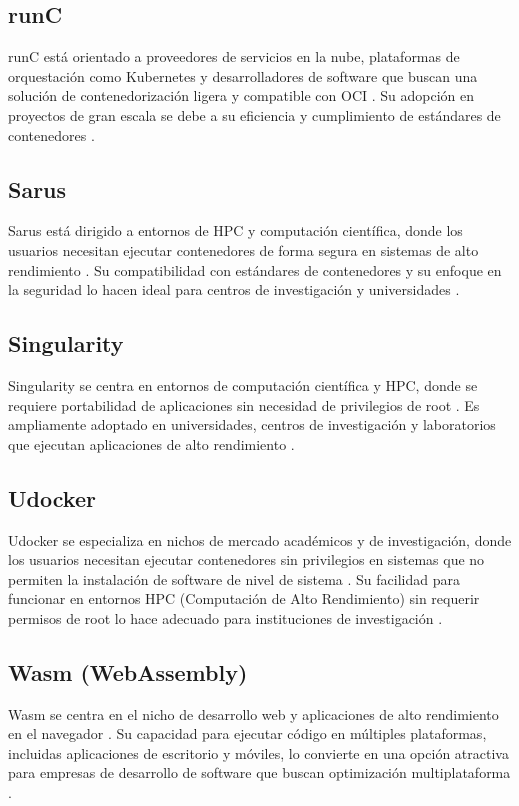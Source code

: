 \subsection{runC}
\noindent
runC está orientado a proveedores de servicios en la nube, plataformas de orquestación como Kubernetes y desarrolladores de software que buscan una solución de contenedorización ligera y compatible con OCI \citep{Perez2005}. Su adopción en proyectos de gran escala se debe a su eficiencia y cumplimiento de estándares de contenedores \citep{151962df5f7e4b9faba0629540c11439}.

\subsection{Sarus}
\noindent
Sarus está dirigido a entornos de HPC y computación científica, donde los usuarios necesitan ejecutar contenedores de forma segura en sistemas de alto rendimiento \citep{Sarus2021}. Su compatibilidad con estándares de contenedores y su enfoque en la seguridad lo hacen ideal para centros de investigación y universidades \citep{B2020}.

\subsection{Singularity}
\noindent
Singularity se centra en entornos de computación científica y HPC, donde se requiere portabilidad de aplicaciones sin necesidad de privilegios de root \citep{10.1145/3332186.3332192}. Es ampliamente adoptado en universidades, centros de investigación y laboratorios que ejecutan aplicaciones de alto rendimiento \citep{Kurtzer2017}.

\subsection{Udocker}
\noindent
Udocker se especializa en nichos de mercado académicos y de investigación, donde los usuarios necesitan ejecutar contenedores sin privilegios en sistemas que no permiten la instalación de software de nivel de sistema \citep{Campos2017}. Su facilidad para funcionar en entornos HPC (Computación de Alto Rendimiento) sin requerir permisos de root lo hace adecuado para instituciones de investigación \citep{Gomes2018}.

\subsection{Wasm (WebAssembly)}
\noindent
Wasm se centra en el nicho de desarrollo web y aplicaciones de alto rendimiento en el navegador \citep{Haas2017}. Su capacidad para ejecutar código en múltiples plataformas, incluidas aplicaciones de escritorio y móviles, lo convierte en una opción atractiva para empresas de desarrollo de software que buscan optimización multiplataforma \citep{Jangda2019}.
\clearpage
